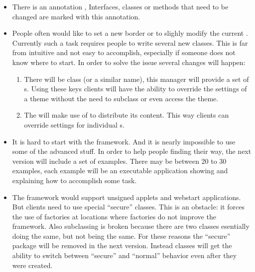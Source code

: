 \begin{itemize}
 \item There is an annotation , Interfaces, classes or methods that need to be changed are marked with this annotation.
 \item People often would like to set a new border or to slighly modify the current . Currently such a task requires people to write several new classes. This is far from intuitive and not easy to accomplish, especially if someone does not know where to start. In order to solve the issue several changes will happen:
 \begin{enumerate}
  \item There will be class  (or a similar name), this manager will provide a set of s. Using these keys clients will have the ability to override the settings of a theme without the need to subclass or even access the theme.
  \item The  will  make use of  to distribute its content. This way clients can override settings for individual s.
 \end{enumerate}
 \item It is hard to start with the framework. And it is nearly impossible to use some of the advanced stuff. In order to help people finding their way, the next version will include a set of examples. There may be between 20 to 30 examples, each example will be an executable application showing and explaining how to accomplish some task.
 \item The framework would support unsigned applets and webstart applications. But clients need to use special ``secure'' classes. This is an obstacle: it forces the use of factories at locations where factories do not improve the framework. Also subclassing is broken because there are two classes esentially doing the same, but not being the same. For these reasons the ``secure'' package will be removed in the next version. Instead classes will get the ability to switch between ``secure'' and ``normal'' behavior even after they were created.
\end{itemize}


 
